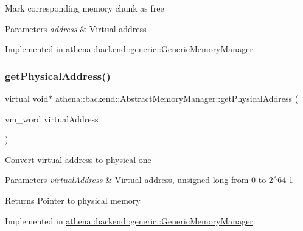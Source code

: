 Mark corresponding memory chunk as free 
\begin{DoxyParams}{Parameters}
{\em address} & Virtual address \\
\hline
\end{DoxyParams}


Implemented in \mbox{\hyperlink{classathena_1_1backend_1_1generic_1_1_generic_memory_manager_a2767b6c1f5887a2928b665e0c1b454c7}{athena\+::backend\+::generic\+::\+Generic\+Memory\+Manager}}.

\mbox{\label{classathena_1_1backend_1_1_abstract_memory_manager_ad441d7a2281f5f2b2627272d136f72b8}} 
\subsubsection{\texorpdfstring{get\+Physical\+Address()}{getPhysicalAddress()}}
{\footnotesize\ttfamily virtual void$\ast$ athena\+::backend\+::\+Abstract\+Memory\+Manager\+::get\+Physical\+Address (\begin{DoxyParamCaption}\item[{vm\+\_\+word}]{virtual\+Address }\end{DoxyParamCaption})\hspace{0.3cm}{\ttfamily [pure virtual]}}

Convert virtual address to physical one 
\begin{DoxyParams}{Parameters}
{\em virtual\+Address} & Virtual address, unsigned long from 0 to 2$^\wedge$64-\/1 \\
\hline
\end{DoxyParams}
\begin{DoxyReturn}{Returns}
Pointer to physical memory 
\end{DoxyReturn}


Implemented in \mbox{\hyperlink{classathena_1_1backend_1_1generic_1_1_generic_memory_manager_a7f3dacb56bd95b837910441d0aef1dd8}{athena\+::backend\+::generic\+::\+Generic\+Memory\+Manager}}.

\mbox{\label{classathena_1_1backend_1_1_abstract_memory_manager_a2bbfba2a5104aab3068d46214a6ae7df}} 
